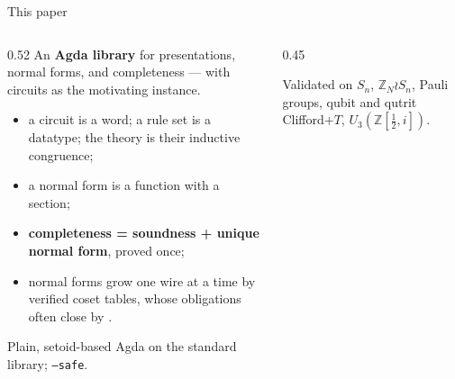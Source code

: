 \begin{frame}{This paper}
\begin{columns}[c]
\begin{column}{0.52\textwidth}
\small
An \textbf{Agda library} for presentations, normal forms, and completeness ---
with \alert{circuits} as the motivating instance.
\begin{itemize}
  \setlength{\itemsep}{1pt}
  \item a circuit is a \alert{word}; a rule set is a \alert{datatype};
        the theory is their \alert{inductive congruence};
  \item a normal form is a \alert{function} with a \alert{section};
  \item \textbf{completeness = soundness + unique normal form}, proved once;
  \item normal forms grow \alert{one wire at a time} by verified \alert{coset
        tables}, whose obligations often close by .
\end{itemize}
\small Plain, setoid-based Agda on the standard library; \texttt{--safe}.
\end{column}
\begin{column}{0.45\textwidth}
\centering
{}

\vspace{8pt}
{\small Validated on $S_n$, $\mathbb{Z}_N\wr S_n$, Pauli groups, qubit and
qutrit Clifford+$T$, $U_3(\mathbb{Z}[\frac12,i])$.}
\end{column}
\end{columns}
\end{frame}
